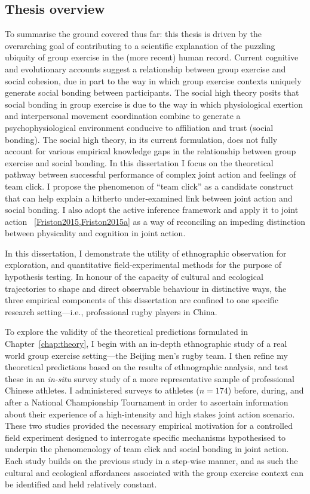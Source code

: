\begin{CJK}{UTF8}{gbsn}
\section{Thesis overview}
To summarise the ground covered thus far: this thesis is driven by the overarching goal of contributing to a scientific explanation of the puzzling ubiquity of group exercise in the (more recent) human record. Current cognitive and evolutionary accounts suggest a relationship between group exercise and social cohesion, due in part to the way in which group exercise contexts uniquely generate social bonding between participants.  The social high theory posits that social bonding in group exercise is due to the way in which physiological exertion and interpersonal movement coordination combine to generate a psychophysiological environment conducive to affiliation and trust (social bonding).  The social high theory, in its current formulation, does not fully account for various empirical knowledge gaps in the relationship between group exercise and social bonding.  In this dissertation I focus on the theoretical pathway between successful performance of complex joint action and feelings of team click.  I propose the phenomenon of ``team click'' as a candidate construct that can help explain a hitherto under-examined link between joint action and social bonding.  I also adopt the active inference framework \citep{Friston2010} and apply it to joint action ~\ref{Friston2015,Friston2015a} as a way of reconciling an impeding distinction between physicality and cognition in joint action.

In this dissertation, I demonstrate the utility of ethnographic observation for exploration, and quantitative field-experimental methods for the purpose of hypothesis testing.  In honour of the capacity of cultural and ecological trajectories to shape and direct observable behaviour in distinctive ways, the three empirical components of this dissertation are confined to one specific research setting---i.e., professional rugby players in China.

To explore the validity of the theoretical predictions formulated in Chapter~\ref{chap:theory}, I begin with an in-depth ethnographic study of a real world group exercise setting---the Beijing men's rugby team.  I then refine my theoretical predictions based on the results of ethnographic analysis, and test these in an \textit{in-situ} survey study of a more representative sample of professional Chinese athletes. I administered surveys to athletes ($n = 174$) before, during, and after a National Championship Tournament in order to ascertain information about their experience of a high-intensity and high stakes joint action scenario.  These two studies provided the necessary empirical motivation for a controlled field experiment designed to interrogate specific mechanisms hypothesised to underpin the phenomenology of team click and social bonding in joint action.  Each study builds on the previous study in a step-wise manner, and as such the cultural and ecological affordances associated with the group exercise context can be identified and held relatively constant.



\end{CJK}
